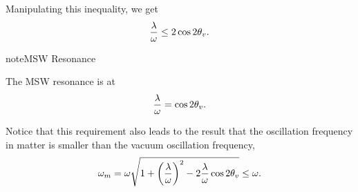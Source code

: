 \documentclass[letterpaper,12pt,english]{sphinxmanual}
\begin{document}
Manipulating this inequality, we get
\begin{gather}
\begin{split}\frac{\lambda}{\omega} \leq 2\cos 2\theta_v.\end{split}\notag
\end{gather}
\begin{notice}{note}{MSW Resonance}

The MSW resonance is at
\begin{gather}
\begin{split}\frac{\lambda}{\omega} = \cos 2\theta_v.\end{split}\notag
\end{gather}\end{notice}

Notice that this requirement also leads to the result that the oscillation frequency in matter is smaller than the vacuum oscillation frequency,
\begin{gather}
\begin{split}\omega_m = \omega \sqrt{ 1 +  \left(\frac{\lambda}{\omega}\right)^2 -2 \frac{\lambda}{\omega} \cos 2\theta_v } \leq \omega.\end{split}\notag
\end{gather}
\end{document}
